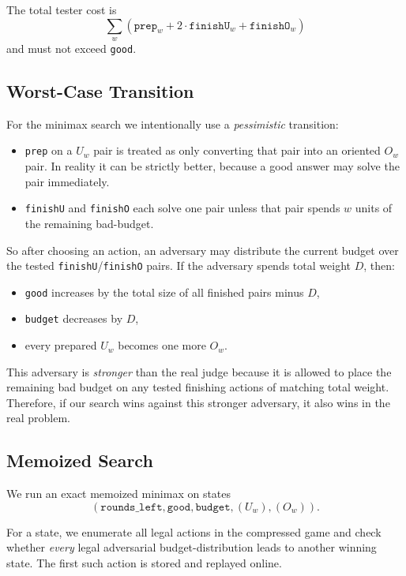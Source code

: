 \documentclass[11pt]{article}
\begin{document}
The total tester cost is
\[
    \sum_w (\texttt{prep}_w + 2\cdot \texttt{finishU}_w + \texttt{finishO}_w)
\]
and must not exceed \texttt{good}.

\subsection*{Worst-Case Transition}

For the minimax search we intentionally use a \emph{pessimistic} transition:

\begin{itemize}[leftmargin=*]
    \item \texttt{prep} on a $U_w$ pair is treated as only converting that pair into an oriented $O_w$ pair. In reality it can be strictly better, because a good answer may solve the pair immediately.
    \item \texttt{finishU} and \texttt{finishO} each solve one pair unless that pair spends $w$ units of the remaining bad-budget.
\end{itemize}

So after choosing an action, an adversary may distribute the current budget over the tested \texttt{finishU}/\texttt{finishO} pairs. If the adversary spends total weight $D$, then:

\begin{itemize}[leftmargin=*]
    \item \texttt{good} increases by the total size of all finished pairs minus $D$,
    \item \texttt{budget} decreases by $D$,
    \item every prepared $U_w$ becomes one more $O_w$.
\end{itemize}

This adversary is \emph{stronger} than the real judge because it is allowed to place the remaining bad budget on any tested finishing actions of matching total weight. Therefore, if our search wins against this stronger adversary, it also wins in the real problem.

\subsection*{Memoized Search}

We run an exact memoized minimax on states
\[
    (\texttt{rounds\_left}, \texttt{good}, \texttt{budget}, (U_w), (O_w)).
\]

For a state, we enumerate all legal actions in the compressed game and check whether \emph{every} legal adversarial budget-distribution leads to another winning state. The first such action is stored and replayed online.
\end{document}
